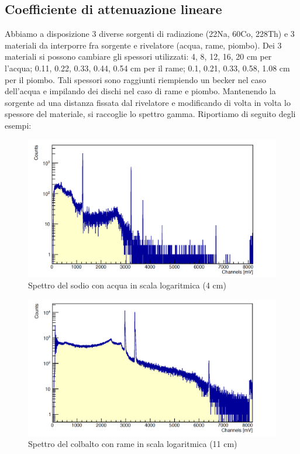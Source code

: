 \documentclass[a4paper,10pt]{article}
\begin{document}
\subsection{Coefficiente di attenuazione lineare}
\noindent Abbiamo a disposizione 3 diverse sorgenti di radiazione (22Na, 60Co, 228Th) e 3 materiali da interporre fra sorgente e rivelatore (acqua, rame, piombo). Dei 3 materiali si possono cambiare gli spessori utilizzati: 4, 8, 12, 16, 20 cm per l'acqua; 0.11, 0.22, 0.33, 0.44, 0.54 cm per il rame; 0.1, 0.21, 0.33, 0.58, 1.08 cm per il piombo. Tali spessori sono raggiunti riempiendo un becker nel caso dell'acqua e impilando dei dischi nel caso di rame e piombo. Mantenendo la sorgente ad una distanza fissata dal rivelatore e modificando di volta in volta lo spessore del materiale, si raccoglie lo spettro gamma. Riportiamo di seguito degli esempi:

\begin{figure}[!h]
    \centering
    \includegraphics[scale=0.4]{img/sodioacqua}
    \caption{Spettro del sodio con acqua in scala logaritmica (4 cm)}
\end{figure}

\begin{figure}[!h]
    \centering
    \includegraphics[scale=0.4]{img/cobaltorame}
    \caption{Spettro del colbalto con rame in scala logaritmica (11 cm)}
\end{figure}
\end{document}
